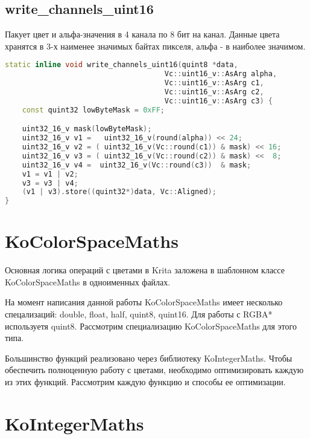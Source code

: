 \subsection{write\_channels\_uint16}
Пакует цвет и альфа-значения в 4 канала по 8 бит на канал. Данные цвета хранятся в 3-х наименее значимых байтах пикселя, альфа - в наиболее значимом.
\begin{lstlisting}[language=c++]
static inline void write_channels_uint16(quint8 *data,
                                     Vc::uint16_v::AsArg alpha,
                                     Vc::uint16_v::AsArg c1,
                                     Vc::uint16_v::AsArg c2,
                                     Vc::uint16_v::AsArg c3) {
    const quint32 lowByteMask = 0xFF;

    uint32_16_v mask(lowByteMask);
    uint32_16_v v1 =   uint32_16_v(round(alpha)) << 24;
    uint32_16_v v2 = ( uint32_16_v(Vc::round(c1)) & mask) << 16;
    uint32_16_v v3 = ( uint32_16_v(Vc::round(c2)) & mask) <<  8;
    uint32_16_v v4 =  uint32_16_v(Vc::round(c3))  & mask;
    v1 = v1 | v2;
    v3 = v3 | v4;
    (v1 | v3).store((quint32*)data, Vc::Aligned);
}
\end{lstlisting}


\section{KoColorSpaceMaths}
Основная логика операций с цветами в Krita заложена в шаблонном классе KoColorSpaceMaths в одноименных файлах. 



На момент написания данной работы KoColorSpaceMaths имеет несколько спецализаций: double, float, half, quint8, quint16. Для работы с RGBA* используетя quint8. Рассмотрим специализацию KoColorSpaceMaths для этого типа.


Большинство функций реализовано через библиотеку KoIntegerMaths.
Чтобы обеспечить полноценную работу с цветами, необходимо оптимизировать каждую из этих функций.
Рассмотрим каждую функцию и способы ее оптимизации.


\section{KoIntegerMaths}

